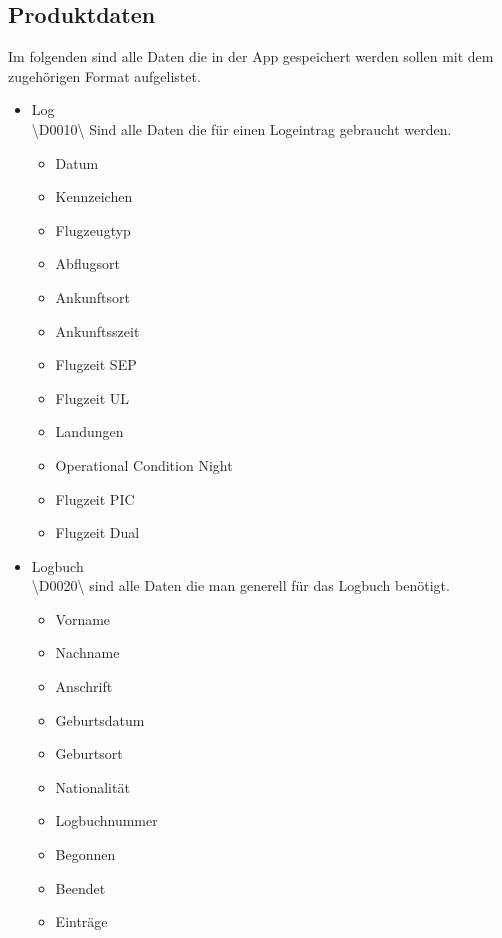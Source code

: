 \documentclass[a4paper]{article} %
\begin{document}
    \subsection{Produktdaten}
    \vspace{1cm}
    Im folgenden sind alle Daten die in der App gespeichert werden sollen mit dem zugehörigen Format aufgelistet.
    \vspace{0.5cm}
    \begin{itemize}
        \item Log\\
        \textbackslash D0010\textbackslash{} Sind alle Daten die für einen Logeintrag gebraucht werden.
        \begin{itemize}
            \item Datum
            \item Kennzeichen
            \item Flugzeugtyp
            \item Abflugsort
            \item Ankunftsort
            \item Ankunftsszeit
            \item Flugzeit SEP
            \item Flugzeit UL
            \item Landungen
            \item Operational Condition Night
            \item Flugzeit PIC
            \item Flugzeit Dual
        \end{itemize}
        \item Logbuch\\
        \textbackslash D0020\textbackslash{} sind alle Daten die man generell für das Logbuch benötigt.
        \begin{itemize}
            \item Vorname
            \item Nachname
            \item Anschrift
            \item Geburtsdatum
            \item Geburtsort
            \item Nationalität
            \item Logbuchnummer
            \item Begonnen
            \item Beendet
            \item Einträge
        \end{itemize}
        \pagebreak
        

\end{itemize}
\end{document}
